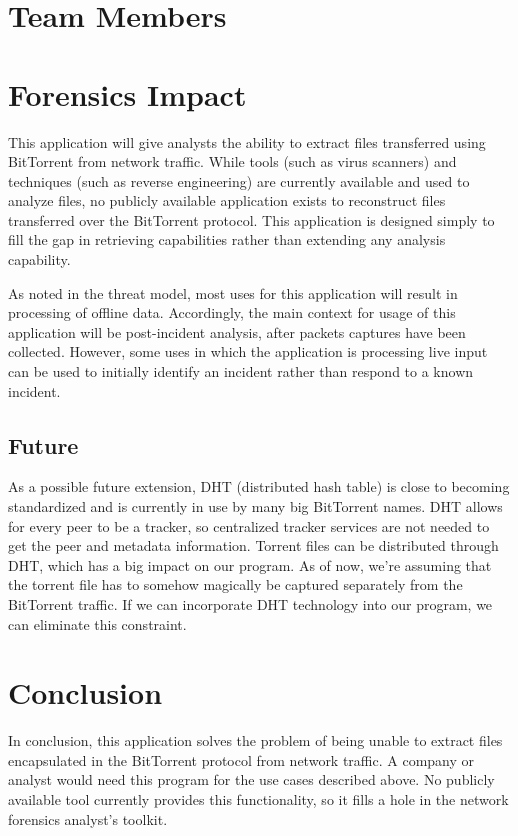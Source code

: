\documentclass{acm_proc_article-sp}
\begin{document}
\section{Team Members}



\section{Forensics Impact}
This application will give analysts the ability to extract files transferred
using BitTorrent from network traffic. While tools (such as virus scanners) and
techniques (such as reverse engineering) are currently available and used to
analyze files, no publicly available application exists to reconstruct files
transferred over the BitTorrent protocol. This application is designed simply to
fill the gap in retrieving capabilities rather than extending any analysis
capability.

As noted in the threat model, most uses for this application will result in
processing of offline data. Accordingly, the main context for usage of this
application will be post-incident analysis, after packets captures have been
collected. However, some uses in which the application is processing live input
can be used to initially identify an incident rather than respond to a known
incident.

\subsection{Future}
As a possible future extension, DHT (distributed hash table) is close
to becoming standardized and is currently in use by many big BitTorrent names.
DHT allows for every peer to be a tracker, so centralized tracker services are
not needed to get the peer and metadata information. Torrent files can be
distributed through DHT, which has a big impact on our program.  As of now,
we're assuming that the torrent file has to somehow magically be captured
separately from the BitTorrent traffic.  If we can incorporate DHT technology
into our program, we can eliminate this constraint.

\section{Conclusion}
In conclusion, this application solves the problem of being unable to extract
files encapsulated in the BitTorrent protocol from network traffic.  A company
or analyst would need this program for the use cases described above.  No
publicly available tool currently provides this functionality, so it fills a
hole in the network forensics analyst's toolkit.

%
%
\end{document}
